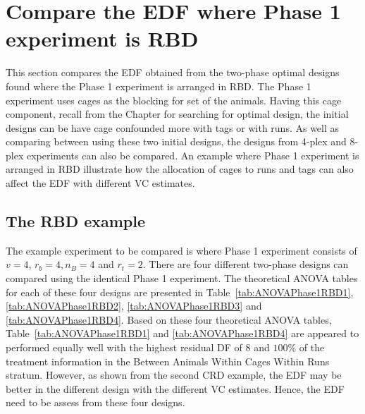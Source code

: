 \documentclass[12pt,a4paper]{article}
\begin{document}
\section{Compare the EDF where Phase 1 experiment is RBD}
\label{sec:expRBD}
This section compares the EDF obtained from the two-phase optimal designs found where the Phase 1 experiment is arranged in RBD. The Phase 1 experiment uses cages as the blocking for set of the animals. Having this cage component, recall from the Chapter for searching for optimal design, the initial designs can be have cage confounded more with tags or with runs. As well as comparing between using these two initial designs, the designs from 4-plex and 8-plex experiments can also be compared. An example where Phase 1 experiment is arranged in RBD illustrate how the allocation of cages to runs and tags can also affect the EDF with different VC estimates.  

\subsection{The RBD example} 
The example experiment to be compared is where Phase 1 experiment consists of $v = 4$, $r_b = 4, n_B  = 4$ and $r_t = 2$. There are four different two-phase designs can compared using the identical Phase 1 experiment. The theoretical ANOVA tables for each of these four designs are presented in Table~\ref{tab:ANOVAPhase1RBD1}, \ref{tab:ANOVAPhase1RBD2}, \ref{tab:ANOVAPhase1RBD3} and \ref{tab:ANOVAPhase1RBD4}. Based on these four theoretical ANOVA tables, Table~\ref{tab:ANOVAPhase1RBD1} and \ref{tab:ANOVAPhase1RBD4} are appeared to performed equally well with the highest residual DF of 8 and $100\%$ of the treatment information in the Between Animals Within Cages Within Runs stratum. However, as shown from the second CRD example, the EDF may be better in the different design with the different VC estimates. Hence, the EDF need to be assess from these four designs. 
\end{document}
